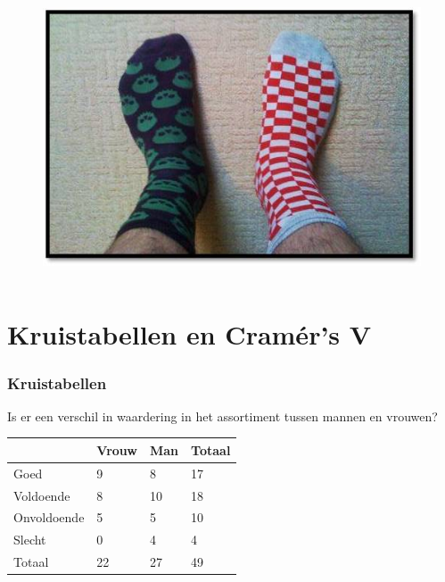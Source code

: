 \documentclass{beamer}
\begin{document}
\begin{frame}
\begin{columns}
\begin{column}{0.3\textwidth}
          \begin{figure}
            \centering
            \includegraphics[width=1.00\textwidth]{img/socks.jpg}
            \label{fig:socks}
          \end{figure}

        \end{column}
      \end{columns}
    \end{frame}

    \section{Kruistabellen en Cramér's V}
    \sectionframelogo{}

    \begin{frame}
      \frametitle{Kruistabellen}
      Is er een verschil in waardering in het assortiment tussen mannen en vrouwen?

      \begin{table}[h]
        \begin{tabular}{l||l|l||l}
          & Vrouw & Man & Totaal \\ \hline \hline
          Goed        & 9     & 8   & 17     \\
          Voldoende   & 8     & 10  & 18     \\
          Onvoldoende & 5     & 5   & 10     \\
          Slecht      & 0     & 4   & 4      \\ \hline \hline
          Totaal      & 22    & 27  & 49     \\
        \end{tabular}
      \end{table}
    \end{frame}
\end{document}
